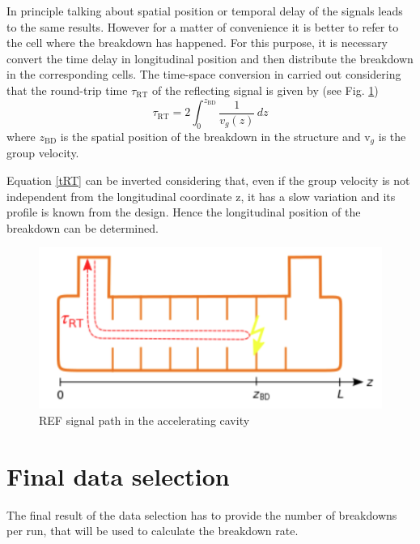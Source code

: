 In principle talking about spatial position or temporal delay of the signals leads to the same results. However for a matter of convenience it is better to refer to the cell where the breakdown has happened. For this purpose, it is necessary convert the time delay in longitudinal position and then distribute the breakdown in the corresponding cells. The time-space conversion in carried out considering that the round-trip time $\tau_{\text{RT}}$  of the reflecting signal is given by (see Fig. \ref{tToz_p})
\begin{equation}
\tau_{\text{RT}} = 2 \int_0^{z_{\text{BD}}} \frac{1}{v_g (z)} \, dz
\label{tRT}
\end{equation}
where $z_{\text{BD}}$ is the spatial position of the breakdown in the structure and v$_g$ is the group velocity.

Equation \ref{tRT} can be inverted considering that, even if the group velocity is not independent from the longitudinal coordinate z, it has a slow variation and its profile is known from the design. Hence the longitudinal position of the breakdown can be determined. 


\begin{figure}[h]
\centering 
\includegraphics[scale=0.3]{pictures/tToz}
\caption{REF signal path in the accelerating cavity}
\label{tToz_p}
\end{figure}




\section[Final data selection]{Final data selection}
\label{sec:BDR}

The final result of the data selection has to provide the number of breakdowns per run, that will be used to calculate the breakdown rate. 

